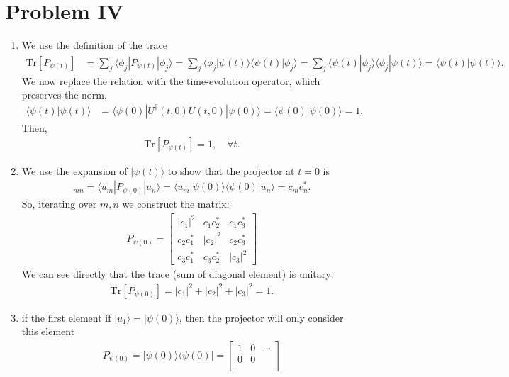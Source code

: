 \documentclass[letterpaper,11pt,twoside]{article}
\newcommand{\ket}[1]{|#1\rangle}
\newcommand{\bra}[1]{\langle#1|}
\newcommand{\braket}[1]{\langle#1\rangle}
\begin{document}
\section*{Problem IV}
\begin{enumerate}[itemsep=0pt,topsep=0pt,label=\alph*)]
  \item We use the definition of the trace
  \begin{align*}
    \text{Tr}[P_{\psi(t)}]&=\sum_j\braket{\phi_j|P_{\psi(t)}|\phi_j}=\sum_j\braket{\phi_j|\psi(t)}\braket{\psi(t)|\phi_j}=\sum_j\braket{\psi(t)|\phi_j}\braket{\phi_j|\psi(t)}=\braket{\psi(t)|\psi(t)}.
  \end{align*}
  We now replace the relation with the time-evolution operator, which preserves the norm,
  \begin{align*}
    \braket{\psi(t)|\psi(t)}&=\braket{\psi(0)|U^\dagger(t,0)U(t,0)|\psi(0)}=\braket{\psi(0)|\psi(0)}=1.
  \end{align*}
  Then,
  \begin{align*}
    \text{Tr}[P_{\psi(t)}]=1,\quad\forall t.
  \end{align*}
  \item We use the expansion of $\ket{\psi(t)}$ to show that the projector at $t=0$ is
  \begin{align*}
    [P_{\psi(0)}]_{mn}=\braket{u_m|P_{\psi(0)}|u_n}=\braket{u_m|\psi(0)}\braket{\psi(0)|u_n}=c_mc_n^*.
  \end{align*}
  So, iterating over $m,n$ we construct the matrix:
  \begin{align*}
    P_{\psi(0)}=\begin{bmatrix}
      |c_1|^2&c_1c_2^*&c_1c_3^*\\c_2c_1^*&|c_2|^2&c_2c_3^*\\c_3c_1^*&c_3c_2^*&|c_3|^2
    \end{bmatrix}
  \end{align*}
  We can see directly that the trace (sum of diagonal element) is unitary:
  \begin{align*}
    \text{Tr}[P_{\psi(0)}]=|c_1|^2+|c_2|^2+|c_3|^2=1.
  \end{align*}
  \item if the first element if $\ket{u_1}=\ket{\psi(0)}$, then the projector will only consider this element 
  \begin{align*}
    P_{\psi(0)}=\ket{\psi(0)}\bra{\psi(0)}=\begin{bmatrix}
      1&0&\cdots\\
      0&0&\\

\end{bmatrix}
\end{align*}
\end{enumerate}
\end{document}
